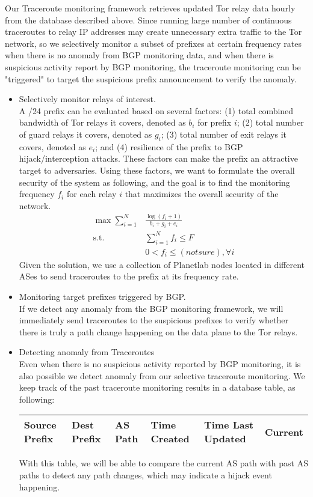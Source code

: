 Our Traceroute monitoring framework retrieves updated Tor relay data hourly from the database described above. Since running large number of continuous traceroutes to relay IP addresses may create unnecessary extra traffic to the Tor network, so we selectively monitor a subset of prefixes at certain frequency rates when there is no anomaly from BGP monitoring data, and when there is suspicious activity report by BGP monitoring, the traceroute monitoring can be "triggered" to target the suspicious prefix announcement to verify the anomaly. 
\begin{itemize}
\item Selectively monitor relays of interest.\\
A /24 prefix can be evaluated based on several factors: (1) total combined bandwidth of Tor relays it covers, denoted as $b_i$ for prefix $i$; (2) total number of guard relays it covers, denoted as $g_i$; (3) total number of exit relays it covers, denoted as $e_i$; and (4) resilience of the prefix to BGP hijack/interception attacks. These factors can make the prefix an attractive target to adversaries. Using these factors, we want to formulate the overall security of the system as following, and the goal is to find the monitoring frequency $f_i$ for each relay $i$ that maximizes the overall security of the network. \\
\begin{align}
\max \sum_{i=1}^N & \frac {\log {(f_i + 1)}} {b_i + g_i + e_i}\\
\text{s.t. } &\sum_{i=1}^N f_i \leq F\\
&0 < f_i \leq (notsure), \forall i
\end{align}
Given the solution, we use a collection of Planetlab nodes located in different ASes to send traceroutes to the prefix at its frequency rate. 
\item Monitoring target prefixes triggered by BGP.\\
If we detect any anomaly from the BGP monitoring framework, we will immediately send traceroutes to the suspicious prefixes to verify whether there is truly a path change happening on the data plane to the Tor relays. 
\item Detecting anomaly from Traceroutes\\
Even when there is no suspicious activity reported by BGP monitoring, it is also possible we detect anomaly from our selective traceroute monitoring. We keep track of the past traceroute monitoring results in a database table, as following:
\begin{center}
\begin{tabular}{ p{8mm} | p{8mm} | p{6mm} | p{1cm} | p{1.1cm} | p{8mm}}
  \hline			
  Source Prefix & Dest Prefix & AS Path & Time Created & Time Last Updated & Current \\
  \hline  
\end{tabular}
\label{tab:pathinfo}
\end{center}
With this table, we will be able to compare the current AS path with past AS paths to detect any path changes, which may indicate a hijack event happening. 


\end{itemize}
